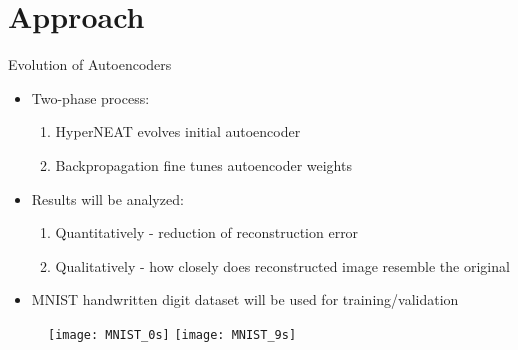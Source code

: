 \documentclass[xcolor=dvipsnames]{beamer}
\begin{document}
	\section{Approach}
	\begin{frame}{Evolution of Autoencoders}
		\begin{itemize}
			\item Two-phase process:
			\begin{enumerate}
				\item HyperNEAT evolves initial autoencoder
				\item Backpropagation fine tunes autoencoder weights
			\end{enumerate}
			
			\item Results will be analyzed:
			\begin{enumerate}
				\item Quantitatively - reduction of reconstruction error
				\item Qualitatively - how closely does reconstructed image resemble the original
			\end{enumerate}

			\item MNIST handwritten digit dataset will be used for training/validation			
		\end{itemize}
		\begin{figure}[h]
			\centering
			\texttt{[image: MNIST\_0s]}
			\texttt{[image: MNIST\_9s]}
		\end{figure}
	\end{frame}
	
\end{document}
